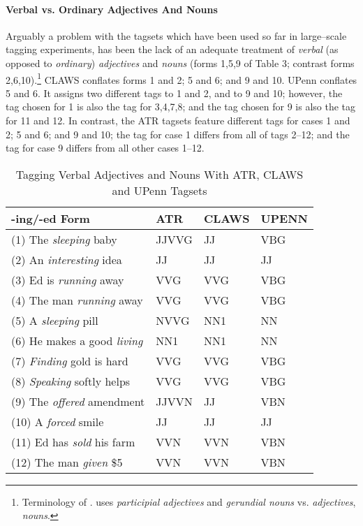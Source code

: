 \paragraph{Verbal vs. Ordinary Adjectives And Nouns}

Arguably a problem with the tagsets which have been used so far in
large--scale tagging experiments, has been the lack of an adequate
treatment of {\em verbal} (as opposed to {\em ordinary}) {\em
adjectives} and {\em nouns} (forms 1,5,9 of Table 3; contrast forms
2,6,10).\footnote{Terminology of \cite{Kruisinga:handbook}. 
\cite{Long:sentence} uses {\em participial adjectives} and {\em gerundial
nouns} vs. {\em adjectives}, {\em nouns}.} CLAWS conflates forms 1 and
2; 5 and 6; and 9 and 10. UPenn conflates 5 and 6. It assigns two
different tags to 1 and 2, and to 9 and 10; however, the tag chosen
for 1 is also the tag for 3,4,7,8; and the tag chosen for 9 is also
the tag for 11 and 12.  In contrast, the ATR tagsets feature different
tags for cases 1 and 2; 5 and 6; and 9 and 10; the tag for case 1
differs from all of tags 2--12; and the tag for case 9 differs from
all other cases 1--12.


\begin{table}
\begin{center}
\caption{Tagging Verbal Adjectives and Nouns With ATR, CLAWS and UPenn Tagsets}
\renewcommand{\arraystretch}{}
\begin{tabular}{|l||l|l|l|} \hline
-ing/-ed Form & ATR			& CLAWS 	& UPENN \\ \hline
(1) The {\em sleeping} baby	& JJVVG	& JJ   &  VBG  \\
(2) An {\em interesting} idea & JJ	& JJ   &  JJ  \\
(3) Ed is {\em running} away & VVG	& VVG   &  VBG  \\
(4) The man {\em running} away & VVG	& VVG   &  VBG  \\
(5) A {\em sleeping} pill  & NVVG	& NN1   &  NN  \\
(6) He makes a good {\em living} & NN1	& NN1   &  NN  \\
(7) {\em Finding} gold is hard & VVG	& VVG   &  VBG  \\
(8) {\em Speaking} softly helps & VVG	& VVG   &  VBG  \\ 
(9) The {\em offered} amendment	& JJVVN	& JJ   &  VBN  \\
(10) A {\em forced} smile & JJ	& JJ   &  JJ  \\
(11) Ed has {\em sold} his farm & VVN	& VVN   &  VBN  \\
(12) The man {\em given} \$5 & VVN	& VVN   &  VBN  \\ \hline
\end{tabular}
\renewcommand{\arraystretch}{}
\end{center}
\end{table}


